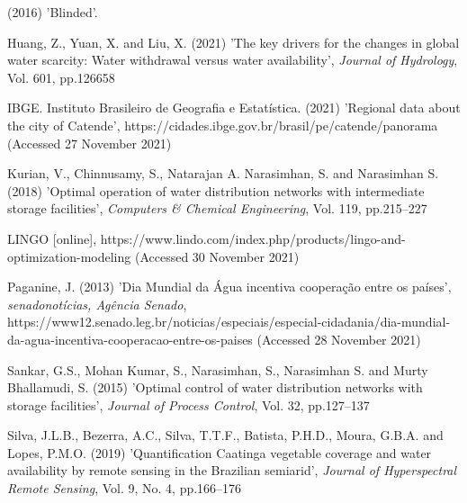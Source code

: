 \documentclass{singlecol}
\theoremstyle{TH}{
\newtheorem{lemma}{Lemma}
\newtheorem{theorem}[lemma]{Theorem}
\newtheorem{corrolary}[lemma]{Corrolary}
\newtheorem{conjecture}[lemma]{Conjecture}
\newtheorem{proposition}[lemma]{Proposition}
\newtheorem{claim}[lemma]{Claim}
\newtheorem{stheorem}[lemma]{Wrong Theorem}
\newtheorem{algorithm}{Algorithm}
}
\theoremstyle{THrm}{
\newtheorem{definition}{Definition}[section]
\newtheorem{question}{Question}[section]
\newtheorem{remark}{Remark}
\newtheorem{scheme}{Scheme}
}
\theoremstyle{THhit}{
\newtheorem{case}{Case}[section]
}
\begin{document}

%
%
%

\begin{thebibliography}{8}

(2016) 'Blinded'.


Huang, Z., Yuan, X. and  Liu, X. (2021) 'The key drivers for the changes in global water scarcity: Water withdrawal versus water availability', {\it Journal of Hydrology}, Vol. 601, pp.126658

IBGE. Instituto Brasileiro de Geografia e Estatística. (2021) 'Regional data about the city of Catende',
https://cidades.ibge.gov.br/brasil/pe/catende/panorama (Accessed 27 November 2021)

Kurian, V., Chinnusamy, S., Natarajan A. Narasimhan, S. and Narasimhan S. (2018) 'Optimal operation of water distribution networks with intermediate storage facilities', {\it Computers \& Chemical Engineering}, Vol. 119, pp.215--227

LINGO [online], https://www.lindo.com/index.php/products/lingo-and-optimization-modeling (Accessed 30 November 2021)

Paganine, J. (2013) 'Dia Mundial da Água incentiva cooperação entre os países', {\it senadonotícias, Agência Senado}, https://www12.senado.leg.br/noticias/especiais/especial-cidadania/dia-mundial-da-agua-incentiva-cooperacao-entre-os-paises (Accessed 28 November 2021)

Sankar, G.S., {Mohan Kumar}, S., Narasimhan, S., Narasimhan S. and {Murty Bhallamudi}, S. (2015) 'Optimal control of water distribution networks with storage facilities', {\it Journal of Process Control}, Vol. 32, pp.127--137

Silva, J.L.B., Bezerra, A.C., Silva, T.T.F., Batista, P.H.D., Moura, G.B.A. and  Lopes, P.M.O. (2019) 'Quantification Caatinga vegetable coverage and water availability by remote sensing in the Brazilian semiarid', {\it Journal of Hyperspectral Remote Sensing}, Vol. 9, No. 4, pp.166--176

\end{thebibliography}
\end{document}
